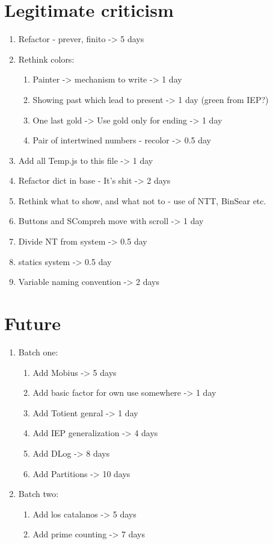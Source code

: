 \documentclass[12pt]{article}
\begin{document}
\section{Legitimate criticism}
\begin {enumerate}
	\item Refactor - prever, finito -> 5 days
	\item Rethink colors:
	\begin{enumerate}
		\item Painter -> mechanism to write -> 1 day
		\item Showing past which lead to present -> 1 day (green from IEP?)
		\item One last gold -> Use gold only for ending -> 1 day
		\item Pair of intertwined numbers - recolor -> 0.5 day
	\end{enumerate}
	\item Add all Temp.js to this file -> 1 day
	\item Refactor dict in base - It's shit -> 2 days
	\item Rethink what to show, and what not to - use of NTT, BinSear etc.
	\item Buttons and SCompreh move with scroll -> 1 day
	\item Divide NT from system -> 0.5 day
	\item statics system -> 0.5 day
	\item Variable naming convention -> 2 days
\end{enumerate}

\section{Future}
\begin{enumerate}
	\item Batch one:
	\begin {enumerate}
		\item Add Mobius -> 5 days
		\item Add basic factor for own use somewhere -> 1 day
		\item Add Totient genral -> 1 day
		\item Add IEP generalization -> 4 days
		\item Add DLog -> 8 days
		\item Add Partitions -> 10 days
	\end{enumerate}

	\item Batch two:
	\begin {enumerate}
		\item Add los catalanos -> 5 days
		\item Add prime counting -> 7 days
	\end{enumerate}
\end{enumerate}
\end{document}
